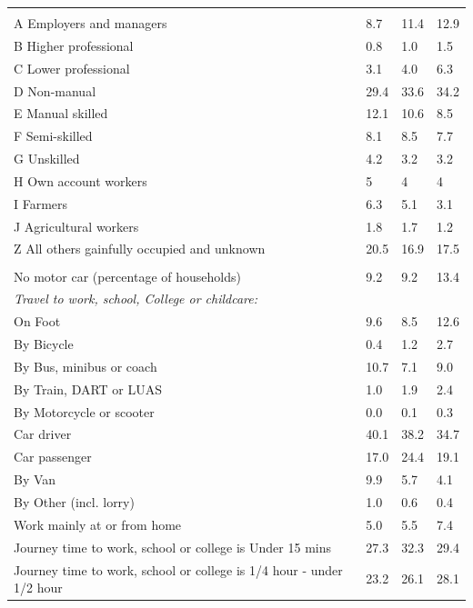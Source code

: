 \documentclass{article}
\begin{document}
\begin{table}[h]
\begin{tabular}{KTTT}
\hline
    \\ 
    \hline
A Employers and managers &  8.7& 11.4& 12.9\\
B Higher professional & 0.8& 1.0& 1.5\\
C Lower professional & 3.1& 4.0& 6.3\\
D Non-manual & 29.4& 33.6& 34.2\\
E Manual skilled & 12.1& 10.6&  8.5\\
F Semi-skilled & 8.1& 8.5& 7.7\\
G Unskilled & 4.2& 3.2& 3.2\\
H Own account workers & 5& 4& 4\\
I Farmers & 6.3& 5.1& 3.1\\
J Agricultural workers & 1.8& 1.7& 1.2\\
Z All others gainfully occupied and unknown & 20.5& 16.9& 17.5\\
\hline
{}\hline
    \\ 
    \hline
No motor car (percentage of households) &  9.2&  9.2& 
13.4\\
    \hline
\emph{Travel to work, school, College or childcare:} & & & \\
\quad On Foot &  9.6&  8.5& 12.6\\
\quad By Bicycle & 0.4& 1.2& 2.7\\
\quad By Bus, minibus or coach & 10.7&  7.1&  9.0\\
\quad By Train, DART or LUAS & 1.0& 1.9& 2.4\\
\quad By Motorcycle or scooter & 0.0& 0.1& 0.3\\
\quad Car driver & 40.1& 38.2& 34.7\\
\quad Car passenger & 17.0& 24.4& 19.1\\
\quad By Van & 9.9& 5.7& 4.1\\
\quad By Other (incl. lorry) & 1.0& 0.6& 0.4\\
    \hline
Work mainly at or from home & 5.0& 5.5& 7.4\\
Journey time to work, school or college is Under 15 mins & 27.3& 32.3& 29.4\\
Journey time to work, school or college is 1/4 hour - under 1/2 hour & 23.2& 26.1& 28.1\\

\end{tabular}
\end{table}
\end{document}
